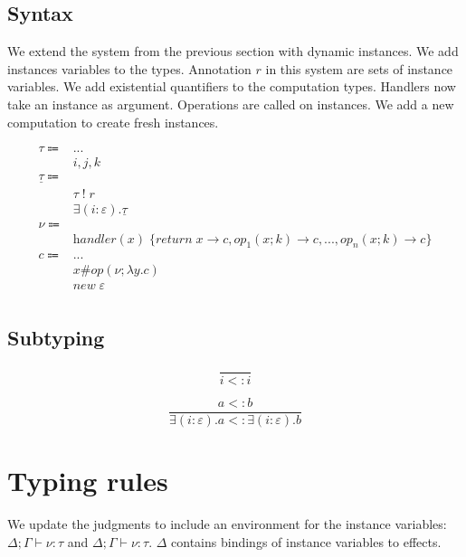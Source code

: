 \documentclass[12pt]{article}
\newcommand\eff[0]{\varepsilon}
\newcommand\op[0]{op}
\newcommand\ty[0]{\tau}
\newcommand\cty[0]{\underline{\ty}}
\newcommand\aty[2]{#1 \; ! \; #2}
\newcommand\texists[3]{\exists(#1:#2) . #3}
\newcommand\val[0]{\nu}
\newcommand\vhandleri[2]{\textit{handler} ( #1 ) \; \{#2\}}
\newcommand\vhandlerci[1]{\vhandleri{#1}{
	\textit{return} \; x \rightarrow \comp,
	\op_1(x ; k) \rightarrow \comp,
	...,
	\op_n(x ; k) \rightarrow \comp
}}
\newcommand\comp[0]{c}
\newcommand\copi[5]{#1 \# #2(#3 ; \lambda #4 . #5)}
\newcommand\cnew[1]{\textit{new} \; #1}
\newcommand\subty[2]{#1 <: #2}
\begin{document}
\subsection{Syntax}
We extend the system from the previous section with dynamic instances.
We add instances variables to the types.
Annotation $r$ in this system are sets of instance variables.
We add existential quantifiers to the computation types.
Handlers now take an instance as argument.
Operations are called on instances.
We add a new computation to create fresh instances.

\begin{align*}
	\ty \Coloneqq 	& ...											\tag{extended value types} \\
									& i, j, k									\tag{instance variables} \\
	\cty \Coloneqq 	& 												\tag{computation types} \\
									& \aty{\ty}{r}						\tag{annotated type} \\
									& \texists{i}{\eff}{\cty}	\tag{existential} \\
	\val \Coloneqq	&													\tag{updated values} \\
									& \vhandlerci{x}					\tag{handler} \\
	\comp \Coloneqq	&	...											\tag{updated/extended computations} \\
									& \copi{x}{\op}{\val}{y}{\comp}	\tag{operation call} \\
									& \cnew{\eff}							\tag{instance creation} \\
\end{align*}

\subsection{Subtyping}
\begin{minipage}{0.5\textwidth}
\[\frac{
}{
	\subty{i}{i}
}\]
\end{minipage}
\begin{minipage}{0.5\textwidth}
\[\frac{
	\subty{a}{b}
}{
	\subty{\texists{i}{\eff}{a}}{\texists{i}{\eff}{b}}
}\]
\end{minipage}

\newpage
\section{Typing rules}
We update the judgments to include an environment for the instance variables:
$\Delta;\Gamma \vdash \val : \ty$ and $\Delta;\Gamma \vdash \val : \ty$.
$\Delta$ contains bindings of instance variables to effects.
\end{document}
